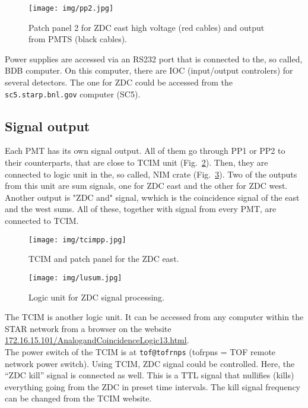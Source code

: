 \begin{figure}[htb]
\begin{center}
\texttt{[image: img/pp2.jpg]}
\end{center}
\caption{Patch panel 2 for ZDC east high voltage (red cables) and output from PMTS (black cables).}
\label{pp2}
\end{figure}

Power supplies are accessed via an RS232 port that is connected to the, so called, BDB computer. On this computer, there are IOC (input/output controlers) for several detectors. The one for ZDC could be accessed from the \texttt{sc5.starp.bnl.gov} computer (SC5).

\subsection{Signal output}

Each PMT has its own signal output. All of them go through PP1 or PP2 to their counterparts, that are close to TCIM unit (Fig.~\ref{tcimpp}). Then, they are connected to logic unit in the, so called, NIM crate (Fig.~\ref{lu_sum}). Two of the outputs from this unit are sum signals, one for ZDC east and the other for ZDC west. Another output is "ZDC and" signal, wwhich is the coincidence signal of the east and the west sums. All of these, together with signal from every PMT, are connected to TCIM.

\begin{figure}[htb]
\begin{center}
\texttt{[image: img/tcimpp.jpg]}
\end{center}
\caption{TCIM and patch panel for the ZDC east.}
\label{tcimpp}
\end{figure}


\begin{figure}[htb]
\begin{center}
\texttt{[image: img/lusum.jpg]}
\end{center}
\caption{Logic unit for ZDC signal processing.}
\label{lu_sum}
\end{figure}

The TCIM is another logic unit.  It can be accessed from any  computer within the STAR network
from a browser on the website\\ 
\url{172.16.15.101/AnalogandCoincidenceLogic13.html}.\\
The power switch of the TCIM is at \texttt{tof@tofrnps} (tofrpns = TOF remote network power switch).
Using TCIM, ZDC signal could be controlled. Here, the ``ZDC kill'' signal is connected as well. This is a TTL signal that nullifies (kills) everything going from the ZDC in preset time intervals. The
kill signal frequency can be changed from the TCIM website.

